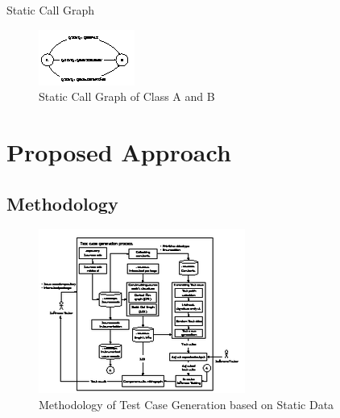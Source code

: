 \documentclass{beamer}
\begin{document}
\begin{frame}{Static Call Graph}
    \begin{figure}
        \includegraphics[width=0.8\paperwidth]{figure/SCG-A-and-B}
        \caption{Static Call Graph of Class A and B}
        \label{fig:staticCallGraphAandB}
    \end{figure}
\end{frame}


%
% 


%
\section{Proposed Approach}
\subsection{Methodology}
\begin{frame}
    \begin{figure}
        \includegraphics[height=0.8\paperheight]{figure/Methodology}
        \caption{Methodology of Test Case Generation based on Static Data}
        \label{fig:methodologyOverview}
    \end{figure}
\end{frame}
\end{document}
